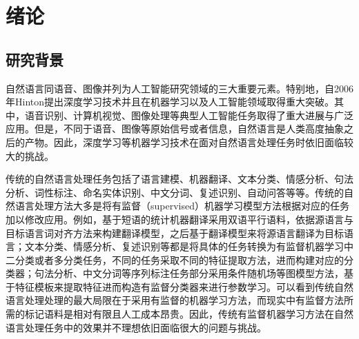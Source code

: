 \documentclass[master]{njuthesis}
\begin{document}
\tableofcontents

\listoffigures

\listoftables

\mainmatter


\chapter{绪论}\label{chapter1_introduction}
\section{研究背景}\label{sec_chap1_background}

自然语言同语音、图像并列为人工智能研究领域的三大重要元素。特别地，自2006年Hinton提出深度学习技术\cite{hinton2006reducing}并且在机器学习以及人工智能领域取得重大突破。其中，语音识别、计算机视觉、图像处理等典型人工智能任务取得了重大进展与广泛应用。但是，不同于语音、图像等原始信号或者信息，自然语言是人类高度抽象之后的产物。因此，深度学习等机器学习技术在面对自然语言处理任务时依旧面临较大的挑战。

传统的自然语言处理任务包括了语言建模、机器翻译、文本分类、情感分析、句法分析、词性标注、命名实体识别、中文分词、复述识别、自动问答等等\cite{collobert2008unified}。传统的自然语言处理方法大多是将有监督（supervised）机器学习模型方法根据对应的任务加以修改应用。例如，基于短语的统计机器翻译采用双语平行语料，依据源语言与目标语言词对齐方法来构建翻译模型，之后基于翻译模型来将源语言翻译为目标语言\cite{chiang2005hierarchical}；文本分类、情感分析、复述识别等都是将具体的任务转换为有监督机器学习中二分类或者多分类任务，不同的任务采取不同的特征提取方法，进而构建对应的分类器\cite{collobert2008unified}；句法分析、中文分词等序列标注任务部分采用条件随机场等图模型方法，基于特征模板来提取特征进而构造有监督分类器来进行参数学习\cite{lafferty2001conditional,zhao2006improved}。可以看到传统自然语言处理处理的最大局限在于采用有监督的机器学习方法，而现实中有监督方法所需的标记语料是相对有限且人工成本昂贵。因此，传统有监督机器学习方法在自然语言处理任务中的效果并不理想依旧面临很大的问题与挑战。
\end{document}
